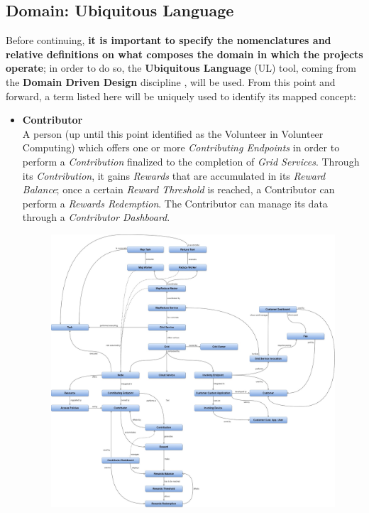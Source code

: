 \subsection{Domain: Ubiquitous Language}\label{ubiquitous_language}
Before continuing, \textbf{it is important to specify the nomenclatures and relative definitions on what composes the domain in which the projects operate}; in order to do so, the \textbf{Ubiquitous Language} (UL) tool, coming from the \textbf{Domain Driven Design} discipline \cite{ddd}, will be used. From this point and forward, a term listed here will be uniquely used to identify its mapped concept:
\begin{itemize}
    \item \textbf{Contributor}\label{contributor}\\
    A person (up until this point identified as the Volunteer in Volunteer Computing) which offers one or more \textit{Contributing Endpoints} in order to perform a \textit{Contribution} finalized to the completion of \textit{Grid Services}. Through its \textit{Contribution}, it gains \textit{Rewards} that are accumulated in its \textit{Reward Balance}; once a certain \textit{Reward Threshold} is reached, a Contributor can perform a \textit{Rewards Redemption}. The Contributor can manage its data through a \textit{Contributor Dashboard}.
    \vspace{10mm}
    \begin{figure}[!ht]
        \centering
        \includegraphics[width=\linewidth]{document/chapters/chapter_4/images/ul.jpg}

\end{figure}
\end{itemize}
